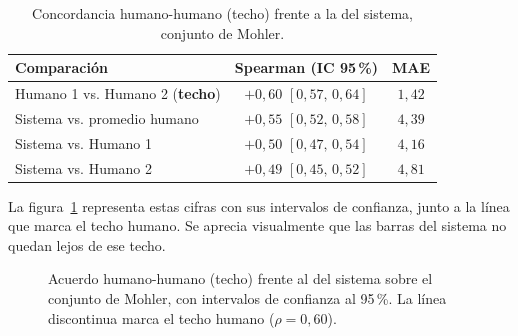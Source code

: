 \begin{table}[ht]
\centering
\caption{Concordancia humano-humano (techo) frente a la del sistema, conjunto de Mohler.}
\label{tab:techo}
\small
\begin{tabularx}{\textwidth}{>{\raggedright\arraybackslash}X c c}
\toprule
Comparación & Spearman (IC 95\,\%) & MAE \\
\midrule
Humano 1 vs. Humano 2 (\textbf{techo}) & $+0{,}60$ $[0{,}57,\,0{,}64]$ & $1{,}42$ \\
Sistema vs. promedio humano & $+0{,}55$ $[0{,}52,\,0{,}58]$ & $4{,}39$ \\
Sistema vs. Humano 1 & $+0{,}50$ $[0{,}47,\,0{,}54]$ & $4{,}16$ \\
Sistema vs. Humano 2 & $+0{,}49$ $[0{,}45,\,0{,}52]$ & $4{,}81$ \\
\bottomrule
\end{tabularx}
\end{table}

La figura~\ref{fig:techo} representa estas cifras con sus intervalos de confianza, junto a la línea que marca el techo humano. Se aprecia visualmente que las barras del sistema no quedan lejos de ese techo.

\begin{figure}[ht]
\centering
{}
\caption{Acuerdo humano-humano (techo) frente al del sistema sobre el conjunto de Mohler, con intervalos de confianza al 95\,\%. La línea discontinua marca el techo humano ($\rho=0{,}60$).}
\label{fig:techo}
\end{figure}

